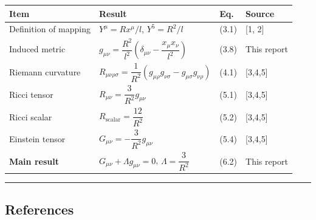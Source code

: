 \documentclass[a4paper,11pt]{article}
\theoremstyle{definition}
\begin{document}
{\def\LTcaptype{table} %
\begin{longtable}[]{@{}
  >{\raggedright\arraybackslash}p{}
  >{\raggedright\arraybackslash}p{}
  >{\raggedright\arraybackslash}p{}
  >{\raggedright\arraybackslash}p{}@{}}
\toprule\noalign{}
\begin{minipage}[b]{\linewidth}\raggedright
Item
\end{minipage} & \begin{minipage}[b]{\linewidth}\raggedright
Result
\end{minipage} & \begin{minipage}[b]{\linewidth}\raggedright
Eq.
\end{minipage} & \begin{minipage}[b]{\linewidth}\raggedright
Source
\end{minipage} \\
\midrule\noalign{}
\endhead
\bottomrule\noalign{}
\endlastfoot
Definition of mapping & \(Y^\mu = Rx^\mu/l\), \(Y^5 = R^2/l\) & (3.1) & {[}1, 2{]} \\
Induced metric & \(g_{\mu\nu} = \dfrac{R^2}{l^2}\!\left(\delta_{\mu\nu} - \dfrac{x_\mu x_\nu}{l^2}\right)\) & (3.8) & This report \\
Riemann curvature & \(R_{\mu\nu\rho\sigma} = \dfrac{1}{R^2}(g_{\mu\rho}g_{\nu\sigma}-g_{\mu\sigma}g_{\nu\rho})\) & (4.1) & {[}3,4,5{]} \\
Ricci tensor & \(R_{\mu\nu} = \dfrac{3}{R^2}g_{\mu\nu}\) & (5.1) & {[}3,4,5{]} \\
Ricci scalar & \(R_{\text{scalar}} = \dfrac{12}{R^2}\) & (5.2) & {[}3,4,5{]} \\
Einstein tensor & \(G_{\mu\nu} = -\dfrac{3}{R^2}g_{\mu\nu}\) & (5.4) & {[}3,4,5{]} \\
\textbf{Main result} & \(G_{\mu\nu} + \Lambda g_{\mu\nu} = 0\), \(\Lambda = \dfrac{3}{R^2}\) & (6.2) & This report \\
\end{longtable}
}

\begin{center}\rule{0.5\linewidth}{0.5pt}\end{center}

\subsection{References}\label{references}
\end{document}
